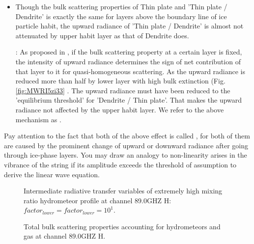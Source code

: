 \begin{itemize}
    \item {}
    Though the bulk scattering properties of Thin plate and 'Thin plate / Dendrite' is exactly the same for layers above the
boundary line of ice particle habit, the upward radiance of 'Thin plate / Dendrite' is almost not attenuated by upper habit layer
as that of Dendrite does. 

    : As proposed in , if the bulk scattering property at a certain layer is fixed, the intensity
of upward radiance determines the sign of net contribution of that layer to it for quasi-homogeneous scattering. 
As the upward radiance is reduced more than half by lower layer with high bulk extinction 
(Fig. \ref{fig:MWRI5zi33} . The upward radiance must have been reduced to the 'equilibrium threshold' 
for 'Dendrite / Thin plate'. That makes the upward radiance not affected by the upper habit layer.
We refer to the above mechanism as .
\end{itemize}

Pay attention to the fact that both of the above effect is called , for both of them are caused by the prominent
change of upward or downward radiance after going through ice-phase layers. You may draw an analogy to non-linearity arises in  
the vibrance of the string if its amplitude exceeds the threshold of assumption to derive the linear wave equation.

\begin{figure}[hbtp] 
\centering
{}
\caption{Intermediate radiative transfer variables of extremely high mixing ratio hydrometeor profile
at channel 89.0GHZ H: $factor_{lower} = factor_{lower} = 10^{1}$.}
\label{fig:MWRI5zi44}
\end{figure}

\begin{figure}[hbtp] 
\centering
{}
\caption{Total bulk scattering properties accounting for hydrometeors and gas at channel 89.0GHZ H.}
\label{fig:MWRI5ABSP}
\end{figure}

